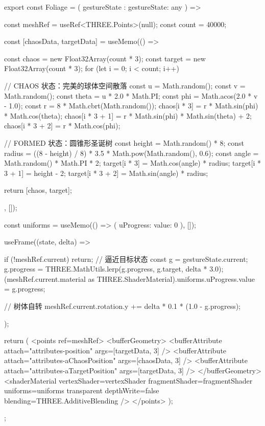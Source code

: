 export const Foliage = ({ gestureState }: { gestureState: any }) => {
  const meshRef = useRef<THREE.Points>(null);
  const count = 40000;

  const [chaosData, targetData] = useMemo(() => {
    const chaos = new Float32Array(count * 3);
    const target = new Float32Array(count * 3);
    for (let i = 0; i < count; i++) {
      // CHAOS 状态：完美的球体空间散落
      const u = Math.random();
      const v = Math.random();
      const theta = u * 2.0 * Math.PI;
      const phi = Math.acos(2.0 * v - 1.0);
      const r = 8 * Math.cbrt(Math.random());
      chaos[i * 3] = r * Math.sin(phi) * Math.cos(theta);
      chaos[i * 3 + 1] = r * Math.sin(phi) * Math.sin(theta) + 2;
      chaos[i * 3 + 2] = r * Math.cos(phi);

      // FORMED 状态：圆锥形圣诞树
      const height = Math.random() * 8; 
      const radius = ((8 - height) / 8) * 3.5 * Math.pow(Math.random(), 0.6);
      const angle = Math.random() * Math.PI * 2;
      target[i * 3] = Math.cos(angle) * radius;
      target[i * 3 + 1] = height - 2; 
      target[i * 3 + 2] = Math.sin(angle) * radius;
    }
    return [chaos, target];
  }, []);

  const uniforms = useMemo(() => ({
    uProgress: { value: 0 }
  }), []);

  useFrame((state, delta) => {
    if (!meshRef.current) return;
    // 逼近目标状态
    const g = gestureState.current;
    g.progress = THREE.MathUtils.lerp(g.progress, g.target, delta * 3.0);
    (meshRef.current.material as THREE.ShaderMaterial).uniforms.uProgress.value = g.progress;
    
    // 树体自转
    meshRef.current.rotation.y += delta * 0.1 * (1.0 - g.progress);
  });

  return (
    <points ref={meshRef}>
      <bufferGeometry>
        <bufferAttribute attach="attributes-position" args={[targetData, 3]} />
        <bufferAttribute attach="attributes-aChaosPosition" args={[chaosData, 3]} />
        <bufferAttribute attach="attributes-aTargetPosition" args={[targetData, 3]} />
      </bufferGeometry>
      <shaderMaterial 
        vertexShader={vertexShader}
        fragmentShader={fragmentShader}
        uniforms={uniforms}
        transparent
        depthWrite={false}
        blending={THREE.AdditiveBlending}
      />
    </points>
  );
};

